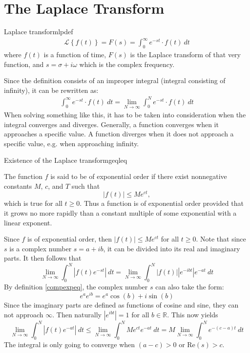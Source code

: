 \section{The Laplace Transform}
\begin{definition}{Laplace transform}{lpdef}
\begin{align}
\mathcal{L} \left\{f(t) \right\}=F(s)=\int_{0}^{\infty} e^{-st}\cdot f(t)\ dt
\end{align}
where $f(t)$ is a function of time, $F(s)$ is the Laplace transform of that very function, and $s=\sigma+i\omega$ which is the complex frequency.
\end{definition}
Since the definition consists of an improper integral (integral consisting of infinity), it can be rewritten as:
\begin{align}
\int_{0}^{\infty} e^{-st}\cdot f(t)\ dt = \lim_{N \to \infty} \int_{0}^{N} e^{-st}\cdot f(t)\ dt
\end{align}
When solving something like this, it has to be taken into consideration when the integral converges and diverges. Generally, a function converges when it approaches a specific value. A function diverges when it does not approach a specific value, e.g. when approaching infinity.

\begin{theorem}{Existence of the Laplace transform}{geqleq}

The function $f$ is said to be of exponential order if there exist nonnegative constants $M$, $c$, and $T$  such that $$|f(t)| \leq Me^{ct},$$
which is true for all $t \geq 0$. Thus a function is of exponential order provided that it grows no more rapidly than a constant multiple of some exponential with a linear exponent. \cite[p. 320]{diffandcomplex}
\end{theorem}
\begin{prof}{}{}
Since $f$ is of exponential order, then $|f(t)| \leq Me^{ct}$ for all $t \geq 0$. Note that since $s$ is a complex number  $s=a+ib$, it can be divided into its real and imaginary parts. It then follows that $$\lim_{N \to \infty} \int_{0}^{N} |f(t)e^{-st}|\ dt = \lim_{N \to \infty} \int_{0}^{N} |f(t)| |e^{-ibt}|e^{-at}\ dt$$
By definition \ref{compexpeq}, the complex number $s$ can also take the form: 
$$e^{a}e^{ib}= e^{a}\cos(b)+i\sin(b)$$
Since the imaginary parts are defined as functions of cosine and sine, they can not approach $\infty$. Then naturally $|e^{ibt}|=1$ for all $b \in \mathbb{R}$. This now yields $$\lim_{N \to \infty} \int_{0}^{N} |f(t)e^{-at}|\ dt \leq \lim_{N \to \infty} \int_{0}^{N} Me^{ct}e^{-at}\ dt = M \lim_{N \to \infty} \int_{0}^{N}e^{-(c-a)t}\ dt $$ The integral is only going to converge when $(a-c)>0$ or Re$(s)>c$.
\end{prof}

